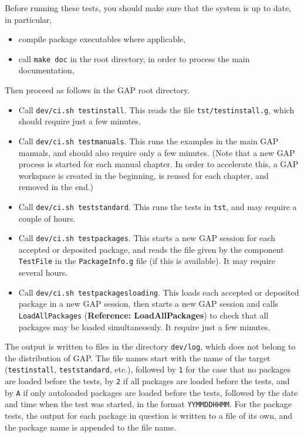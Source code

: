\documentclass[a4paper,11pt]{report}
\begin{document}
{{ Before running these tests, you should make sure that the system is up to
date, in particular, 
\begin{itemize}
\item  compile package executables where applicable, 
\item  call \texttt{make doc} in the root directory, in order to process the main documentation, 
\end{itemize}
 Then proceed as follows in the \textsf{GAP} root directory. 
\begin{itemize}
\item  Call \texttt{dev/ci.sh testinstall}. This reads the file \texttt{tst/testinstall.g}, which should require just a few minutes. 
\item  Call \texttt{dev/ci.sh testmanuals}. This runs the examples in the main \textsf{GAP} manuals, and should also require only a few minutes. (Note that a new \textsf{GAP} process is started for each manual chapter. In order to accelerate this, a \textsf{GAP} workspace is created in the beginning, is reused for each chapter, and removed
in the end.) 
\item  Call \texttt{dev/ci.sh teststandard}. This runs the tests in \texttt{tst}, and may require a couple of hours. 
\item  Call \texttt{dev/ci.sh testpackages}. This starts a new \textsf{GAP} session for each accepted or deposited package, and reads the file given by
the component \texttt{TestFile} in the \texttt{PackageInfo.g} file (if this is available). It may require several hours. 
\item  Call \texttt{dev/ci.sh testpackagesloading}. This loads each accepted or deposited package in a new \textsf{GAP} session, then starts a new \textsf{GAP} session and calls \texttt{LoadAllPackages} (\textbf{Reference: LoadAllPackages}) to check that all packages may be loaded simultaneosuly. It require just a few
minutes. 
\end{itemize}
 

 The output is written to files in the directory \texttt{dev/log}, which does not belong to the distribution of \textsf{GAP}. The file names start with the name of the target (\texttt{testinstall}, \texttt{teststandard}, etc.), followed by \texttt{1} for the case that no packages are loaded before the tests, by \texttt{2} if all packages are loaded before the tests, and by \texttt{A} if only autoloaded packages are loaded before the tests, followed by the date
and time when the test was started, in the format \texttt{{\textunderscore}YY{\textunderscore}MM{\textunderscore}DD{\textunderscore}HH{\textunderscore}MM}. For the package tests, the output for each package in question is written to
a file of its own, and the package name is appended to the file name. 

}}
\end{document}
